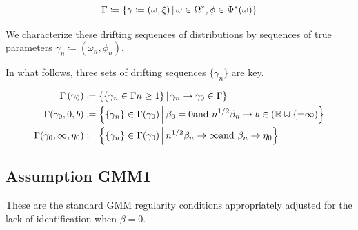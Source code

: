 \documentclass[11pt]{article}
\newcommand*{\R}{\mathbb{R}}
\newcommand{\mvert}[1][\middle]{\ensuremath{\,#1\vert\,}}
\begin{document}
\begin{equation}
    \Gamma \coloneqq \left\lbrace \gamma \coloneqq (\omega, \xi) \mvert \omega \in \Omega^{*}, \phi \in
    \Phi^{*}(\omega) \right\rbrace 
\end{equation}

We characterize these drifting sequences of distributions by sequences of true parameters $\gamma_n \coloneqq
(\omega_n, \phi_n)$.

In what follows, three sets of drifting sequences $\lbrace \gamma_n \rbrace$ are key. 

\begin{align}
    \Gamma\left(\gamma_0\right) &\coloneqq \left\lbrace \left\lbrace \gamma_n \in \Gamma n \geq 1 \right\rbrace
        \mvert \gamma_n \to \gamma_0 \in \Gamma \right\rbrace\\ 
    \Gamma(\gamma_0, 0, b) &\coloneqq \left\lbrace \lbrace \gamma_n \rbrace \in \Gamma(\gamma_0) \mvert \beta_0 =
        0 \text{and}\ n^{1/2} \beta_n \to b \in (\R \Cup \lbrace \pm \infty) \right\rbrace \\
    \Gamma(\gamma_0, \infty, \eta_0) &\coloneqq \left\lbrace \lbrace \gamma_n \rbrace \in \Gamma (\gamma_0) \mvert
        n^{1/2} \beta_n \to \infty \text{and}\ \beta_n \to \eta_0 \right\rbrace 
\end{align}

\subsection{Assumption GMM1}

These are the standard GMM regularity conditions appropriately adjusted for the lack of identification when $\beta
=0$.
\end{document}
